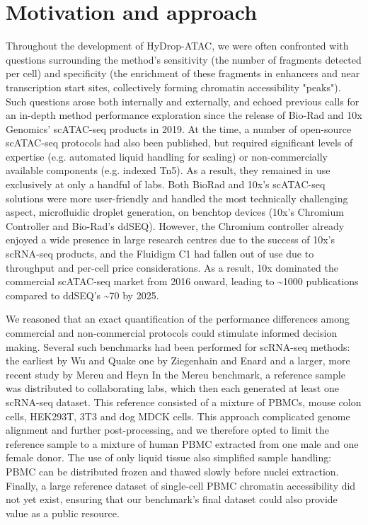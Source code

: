 \section{Motivation and approach}
Throughout the development of HyDrop-ATAC, we were often confronted with questions surrounding the method's sensitivity (the number of fragments detected per cell) and specificity (the enrichment of these fragments in enhancers and near transcription start sites, collectively forming chromatin accessibility "peaks"). Such questions arose both internally and externally, and echoed previous calls for an in-depth method performance exploration since the release of Bio-Rad and 10x Genomics' scATAC-seq products in 2019. At the time, a number of open-source scATAC-seq protocols had also been published, but required significant levels of expertise (e.g. automated liquid handling for scaling) or non-commercially available components (e.g. indexed Tn5). As a result, they remained in use exclusively at only a handful of labs. Both BioRad and 10x's scATAC-seq solutions were more user-friendly and handled the most technically challenging aspect, microfluidic droplet generation, on benchtop devices (10x's Chromium Controller and Bio-Rad's ddSEQ). However, the Chromium controller already enjoyed a wide presence in large research centres due to the success of 10x's scRNA-seq products, and the Fluidigm C1 had fallen out of use due to throughput and per-cell price considerations. As a result, 10x dominated the commercial scATAC-seq market from 2016 onward, leading to \textasciitilde{1000} publications compared to ddSEQ's \textasciitilde{70} by 2025.

We reasoned that an exact quantification of the performance differences among commercial and non-commercial protocols could stimulate informed decision making. Several such benchmarks had been performed for scRNA-seq methods: the earliest by Wu and Quake one by Ziegenhain and Enard and a larger, more recent study by Mereu and Heyn In the Mereu benchmark, a reference sample was distributed to collaborating labs, which then each generated at least one scRNA-seq dataset. This reference consisted of a mixture of PBMCs, mouse colon cells, HEK293T, 3T3 and dog MDCK cells. This approach complicated genome alignment and further post-processing, and we therefore opted to limit the reference sample to a mixture of human PBMC extracted from one male and one female donor. The use of only liquid tissue also simplified sample handling: PBMC can be distributed frozen and thawed slowly before nuclei extraction. Finally, a large reference dataset of single-cell PBMC chromatin accessibility did not yet exist, ensuring that our benchmark's final dataset could also provide value as a public resource.


